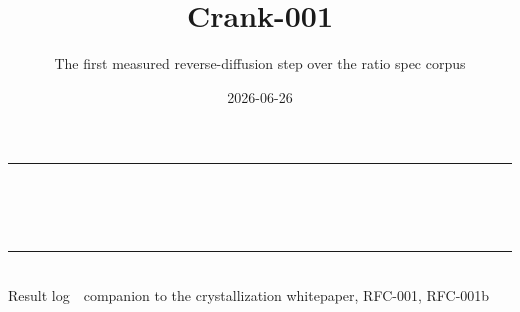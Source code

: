 \documentclass[aspectratio=169,11pt]{beamer}
\title{Crank-001}
\subtitle{The first measured reverse-diffusion step over the ratio spec corpus}
\date{2026-06-26}
\begin{document}
{%
\begin{frame}[plain]
  \vfill
  \begin{center}
    {\color{ratioBrown}\rule{0.5\textwidth}{1.5pt}}\\[1.2em]
    {\inserttitle}\\[0.6em]
    {\large\color{ratioInk}\insertsubtitle}\\[1.0em]
    {\color{ratioBrown}\rule{0.5\textwidth}{1.5pt}}\\[1.4em]
    {\footnotesize\color{ratioInk}Result log\, \textbar\, companion to the crystallization whitepaper, RFC-001, RFC-001b\, \textbar\, \insertdate}
  \end{center}
  \vfill
\end{frame}
}
\end{document}

